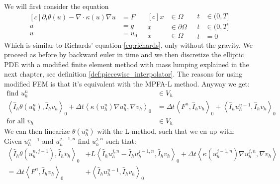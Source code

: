 \documentclass[../Main/main.tex]{subfiles}
\begin{document}
	
	We will first consider the equation
	\begin{equation}\label{eq:richards simple}
		\begin{aligned}[c]
			\partial_t \theta(u) - \nabla \cdot \kappa (u) \nabla u &= F \\
			u &= g \\
			u &= u_0
		\end{aligned}
		\ \ \
		\begin{aligned}[c]
			x &\in \Omega  \\
			x &\in \partial \Omega \\
			x &\in \Omega  
		\end{aligned}
		\ \ \
		\begin{aligned}
			t&\in (0,T] \\
			t&\in (0,T] \\
			t&=0
		\end{aligned}
	\end{equation}
	Which is similar to Richards' equation \eqref{eq:richards}, only without the gravity. We proceed as before by backward euler in time and we then discretize the elliptic PDE with a modified finite element method with mass lumping explained in the next chapter, see definition \ref{def:piecewise_interpolator}. The reasons for using modified FEM is that it's equivalent with the MPFA-L method. Anyway we get:
	\begin{equation}\label{eq:richards_timedisc}
		\begin{aligned}
			\text{find }u_h^n&\in V_h\\
			\left \langle \hat{I}_h \theta(u_h^n),\hat{I}_h v_h \right \rangle_0 +\Delta t \left \langle \kappa(u_h^n) \nabla u^n_h, \nabla v_h \right \rangle_0 &= \Delta t \left \langle F^n,\hat{I}_h v_h \right \rangle_0 + \left \langle \hat{I}_h u_h^{n-1},\hat{I}_h v_h \right \rangle_0 \\
			\text{for all }v_h &\in V_h
		\end{aligned}
	\end{equation}
	We can then linearize $\theta(u^n_h)$ with the L-method, such that we en up with: Given $u^{n-1}_h$ and $u^{j-1,n}_h$ find $u^{j,n}_h$ such that:
	\begin{equation}\label{eq:L-scheme-FEM}
		\begin{aligned}
			\left \langle \hat{I}_h \theta(u^{n,j-1}_h),\hat{I}_h v_h \right \rangle_0 &+ L \left \langle \hat{I}_h u^{j,n}_h -  \hat{I}_h u^{j-1,n}_h,\hat{I}_h v_h \right \rangle_0 + \Delta t \left \langle \kappa(u_h^{j-1,n})\nabla u^{j,n}_h,\nabla v_h \right \rangle \\=\Delta t \left \langle F^n,\hat{I}_h v_h \right \rangle_0 &+ \left \langle \hat{I}_h u_h^{n-1},\hat{I}_h v_h \right \rangle_0 
		\end{aligned}
	\end{equation}
\end{document}
